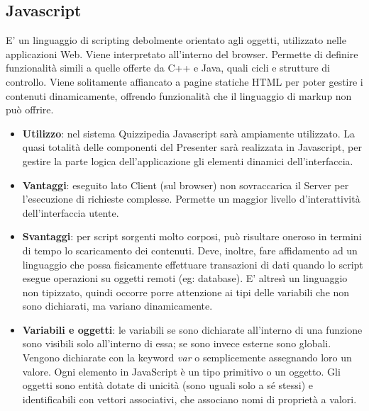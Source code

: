 \rigaregistro{0.0.17}{Luca Alessio (Progettista)}{12/05/2016}{Termine stesura sezione diagrammi e revisione/ampliamento di vari paragrafi}\documentclass[a4paper,11pt]{article}
\begin{document}
	\subsection{Javascript}
	E' un linguaggio di scripting debolmente orientato agli oggetti, utilizzato nelle applicazioni
Web. Viene interpretato all'interno del browser. Permette di definire funzionalità simili a
quelle offerte da C++ e Java, quali cicli e strutture di controllo.
Viene solitamente affiancato a pagine statiche HTML per poter gestire i contenuti dinamicamente, offrendo funzionalità che il linguaggio di markup non può offrire.
	\begin{itemize}
		\item\textbf{Utilizzo}: nel sistema Quizzipedia Javascript sarà ampiamente utilizzato. La quasi totalità delle componenti del Presenter sarà realizzata in Javascript, per gestire la parte logica dell'applicazione gli elementi dinamici dell'interfaccia.
		\item\textbf{Vantaggi}: eseguito lato Client (sul browser) non sovraccarica il Server per l'esecuzione di richieste complesse. Permette un maggior livello d'interattività dell'interfaccia utente.
		\item\textbf{Svantaggi}: per script sorgenti molto corposi, può risultare oneroso in termini di
tempo lo scaricamento dei contenuti. Deve, inoltre, fare affidamento ad un linguaggio
che possa fisicamente effettuare transazioni di dati quando lo script esegue operazioni
su oggetti remoti (eg: database).
E' altresì un linguaggio non tipizzato, quindi occorre porre attenzione ai tipi delle
variabili che non sono dichiarati, ma variano dinamicamente.
		\item\textbf{Variabili e oggetti}: le variabili se sono dichiarate all'interno di una funzione sono
visibili solo all'interno di essa; se sono invece esterne sono globali. Vengono dichiarate
con la keyword \emph{var} o semplicemente assegnando loro un valore.
Ogni elemento in JavaScript è un tipo primitivo o un oggetto.
Gli oggetti sono entità dotate di unicità (sono uguali solo a sé stessi) e identificabili
con vettori associativi, che associano nomi di proprietà a valori.
	\end{itemize}
\end{document}
